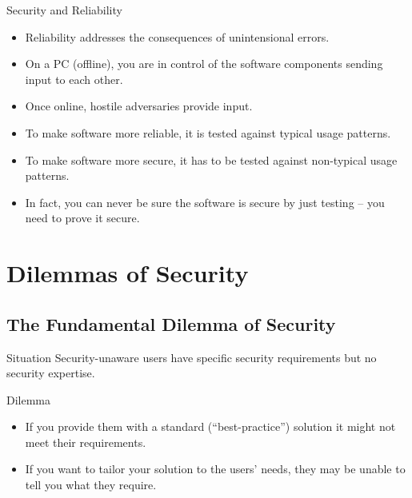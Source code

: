\documentclass{beamer}
\begin{document}
\begin{frame}{\insertsubsectionhead}{Security and Reliability}
  \begin{itemize}
    \item Reliability addresses the consequences of unintensional errors.

    \item On a PC (offline), you are in control of the software components 
      sending input to each other.

    \item Once online, hostile adversaries provide input.

    \item To make software more reliable, it is tested against typical usage 
      patterns.

    \item To make software more secure, it has to be tested against non-typical 
      usage patterns.

    \item In fact, you can never be sure the software is secure by just testing 
      -- you need to prove it secure.
  \end{itemize}
\end{frame}


\section{Dilemmas of Security}

\subsection{The Fundamental Dilemma of Security}

\begin{frame}{\insertsubsectionhead}
  \begin{block}{Situation}
    Security-unaware users have specific security requirements but no security 
    expertise.
  \end{block}

  \begin{block}{Dilemma}
    \begin{itemize}
      \item If you provide them with a standard (``best-practice'') solution it 
        might not meet their requirements.

      \item If you want to tailor your solution to the users' needs, they may 
        be unable to tell you what they require.

    \end{itemize}
  \end{block}
\end{frame}
\end{document}
